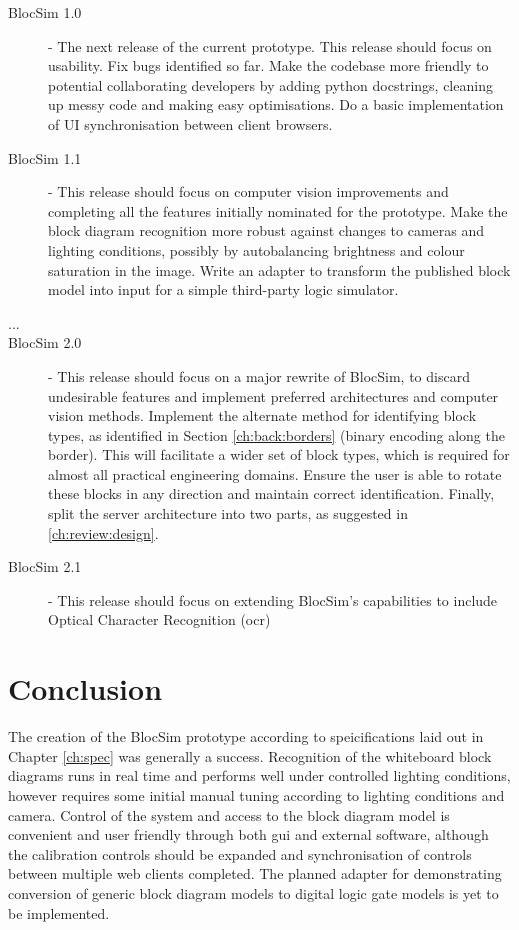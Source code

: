 \begin{description}
	\item[BlocSim 1.0] - The next release of the current prototype. This release should focus on usability. Fix bugs identified so far. Make the codebase more friendly to potential collaborating developers by adding python docstrings, cleaning up messy code and making easy optimisations. Do a basic implementation of UI synchronisation between client browsers.
	\item[BlocSim 1.1] - This release should focus on computer vision improvements and completing all the features initially nominated for the prototype. Make the block diagram recognition more robust against changes to cameras and lighting conditions, possibly by autobalancing brightness and colour saturation in the image. Write an adapter to transform the published block model into input for a simple third-party logic simulator.
	\item[ ... ]
	\item[BlocSim 2.0] - This release should focus on a major rewrite of BlocSim, to discard undesirable features and implement preferred architectures and computer vision methods. Implement the alternate method for identifying block types, as identified in Section \ref{ch:back:borders} (binary encoding along the border). This will facilitate a wider set of block types, which is required for almost all practical engineering domains. Ensure the user is able to rotate these blocks in any direction and maintain correct identification. Finally, split the server architecture into two parts, as suggested in \ref{ch:review:design}. 
	\item[BlocSim 2.1] - This release should focus on extending BlocSim's capabilities to include Optical Character Recognition (\gls{ocr})
\end{description}


\chapter{Conclusion}

The creation of the BlocSim prototype according to speicifications laid out in Chapter \ref{ch:spec} was generally a success. Recognition of the whiteboard block diagrams runs in real time and performs well under controlled lighting conditions, however requires some initial manual tuning according to lighting conditions and camera. Control of the system and access to the block diagram model is convenient and user friendly through both \gls{gui} and external software, although the calibration controls should be expanded and synchronisation of controls between multiple web clients completed. The planned adapter for demonstrating conversion of generic block diagram models to digital logic gate models is yet to be implemented.
\\


